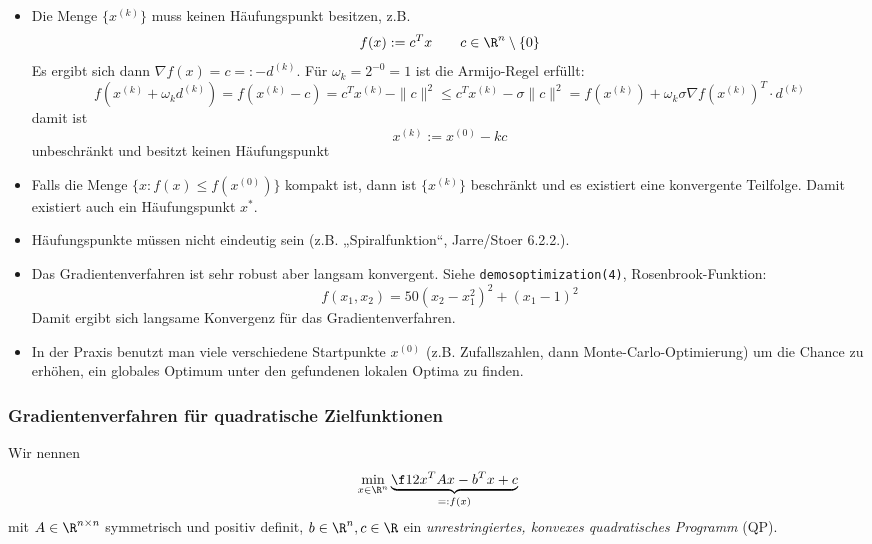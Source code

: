 \documentclass[11pt]{scrartcl}
\begin{document}
\begin{st}[Konvergenz]
\begin{note}
\begin{itemize}
			\item
				Die Menge $\{x^{(k)}\}$ muss keinen Häufungspunkt besitzen, z.B.
				\[
					f(x) := c^T x \qquad c \in \R^n \setminus\{0\}
				\]
				Es ergibt sich dann $\nabla f(x) = c =: -d^{(k)}$.
				Für $\omega_k = 2^{-0} = 1$ ist die Armijo-Regel erfüllt:
				\[
					f(x^{(k)} +\omega_k d^{(k)}) = f(x^{(k)} - c) = c^T x^{(k)} - \|c\|^2 \le c^T x^{(k)} - \sigma \|c\|^2 = f(x^{(k)}) + \omega_k \sigma \nabla f(x^{(k)})^T \cdot d^{(k)}
				\]
				damit ist
				\[
					x^{(k)} := x^{(0)} - k c
				\]
				unbeschränkt und besitzt keinen Häufungspunkt
			\item
				Falls die Menge $\{x : f(x) \le f(x^{(0)}) \}$ kompakt ist, dann ist $\{x^{(k)}\}$ beschränkt und es existiert eine konvergente Teilfolge.
				Damit existiert auch ein Häufungspunkt $x^*$.
			\item
				Häufungspunkte müssen nicht eindeutig sein (z.B. „Spiralfunktion“, Jarre/Stoer 6.2.2.).
			\item
				Das Gradientenverfahren ist sehr robust aber langsam konvergent.
				Siehe \texttt{demos\textunderscore optimization(4)}, Rosenbrook-Funktion:
				\[
					f(x_1, x_2) = 50 (x_2-x_1^2)^2 + (x_1-1)^2
				\]
				Damit ergibt sich langsame Konvergenz für das Gradientenverfahren.
			\item
				In der Praxis benutzt man viele verschiedene Startpunkte $x^{(0)}$ (z.B. Zufallszahlen, dann Monte-Carlo-Optimierung) um die Chance zu erhöhen, ein globales Optimum unter den gefundenen lokalen Optima zu finden.
		 \end{itemize}
	 \end{note}
\end{st}


\subsubsection{Gradientenverfahren für quadratische Zielfunktionen}


\begin{df}[Unrestringiertes QP] \label{4.9}
	Wir nennen
	\[
		\min_{x\in \R^n} \underbrace{\f 12 x^T A x - b^T x + c}_{=:f(x)}
	\]
	mit $A \in \R^{n\times n}$ symmetrisch und positiv definit, $b\in \R^n, c\in \R$ ein
	\emph{unrestringiertes, konvexes quadratisches Programm} (QP).
\end{df}
\end{document}
